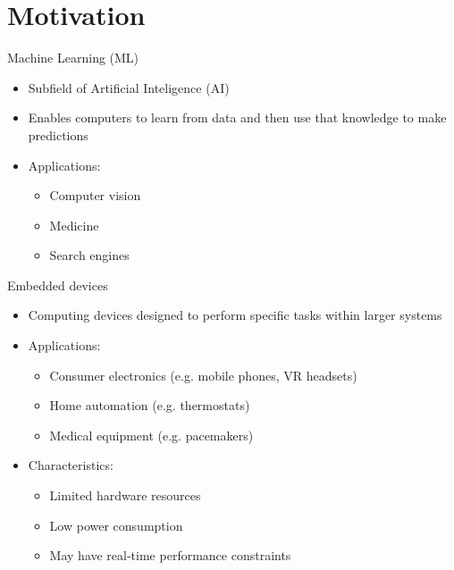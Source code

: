 
\section{Motivation}

\begin{frame}{Machine Learning (ML)}
  \begin{itemize}
	\item Subfield of Artificial Inteligence (AI)
	\item Enables computers to learn from data and then use that knowledge to
	make predictions
	\item Applications:
	  \begin{itemize}
		\item Computer vision
		\item Medicine
		\item Search engines
	  \end{itemize}
  \end{itemize}
\end{frame}

\begin{frame}{Embedded devices}
  \begin{itemize}
	\item Computing devices designed to perform specific tasks within larger systems
	\item Applications:
	  \begin{itemize}
		\item Consumer electronics (e.g. mobile phones, VR headsets)
		\item Home automation (e.g. thermostats)
		\item Medical equipment (e.g. pacemakers)
	  \end{itemize}
	\item Characteristics:
	  \begin{itemize}
		\item Limited hardware resources
		\item Low power consumption
		\item May have real-time performance constraints
	  \end{itemize}
  \end{itemize}
\end{frame}

